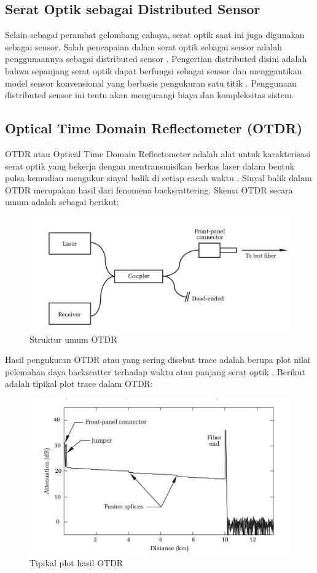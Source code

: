 \documentclass[12pt]{article}
\begin{document}
	\subsection{Serat Optik sebagai Distributed Sensor}
	
	Selain sebagai perambat gelombang cahaya, serat optik saat ini juga digunakan sebagai sensor.
	Salah pencapaian dalam serat optik sebagai sensor adalah penggunaannya sebagai distributed sensor \cite{Dakin1992}.
	Pengertian distributed  disini adalah bahwa sepanjang serat optik dapat berfungsi sebagai sensor dan menggantikan model sensor konvensional yang berbasis pengukuran satu titik \cite{Wu2015}.
	Penggunaan distributed sensor ini tentu akan mengurangi biaya dan kompleksitas sistem.
	
	\subsection{Optical Time Domain Reflectometer (OTDR)}
	
	OTDR atau Optical Time Domain Reflectometer adalah alat untuk karakterisasi serat optik yang bekerja dengan mentransmisikan berkas laser dalam bentuk pulsa kemudian mengukur sinyal balik di setiap cacah waktu \cite{test2017}.
	Sinyal balik dalam OTDR merupakan hasil dari fenomena backscattering.
	Skema OTDR secara umum adalah sebagai berikut:
	
	\begin{figure}[h!]
		\centering
		\captionsetup{justification=centering}
		\includegraphics[width=0.65\linewidth]{images/Bab_2/Bab_2_5}
		\caption[Struktur umum OTDR]{\small{Struktur umum OTDR}}
	\end{figure}

	Hasil pengukuran OTDR atau yang sering disebut trace adalah berupa plot nilai pelemahan daya backscatter terhadap waktu atau panjang serat optik \cite{Anderson2004}.
	Berikut adalah tipikal plot trace dalam OTDR:
	
	\begin{figure}[h!]
		\centering
		\captionsetup{justification=centering}
		\includegraphics[width=0.7\linewidth]{images/Bab_2/Bab_2_6}
		\caption[Tipikal plot hasil OTDR]{\small{Tipikal plot hasil OTDR}}
	\end{figure}
\end{document}
